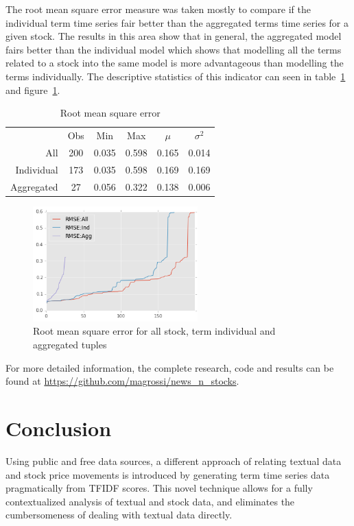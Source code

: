 \documentclass[conference,11pt]{IEEEtran}
\begin{document}
\par
The root mean square error measure was taken mostly to compare if the individual term time series fair better than the aggregated terms time series for a given stock. The results in this area show that in general, the aggregated model fairs better than the individual model which shows that modelling all the terms related to a stock into the same model is more advantageous than modelling the terms individually. The descriptive statistics of this indicator can seen in table~\ref{tab:1} and figure~\ref{fig:rmse_line}.

\begin{table}
\caption{Root mean square error}
\label{tab:1}
\begin{tabular}{ r c c c c c }
           & Obs & Min & Max & \(\mu\) & \(\sigma^2\) \\
  All & 200 & 0.035 & 0.598 & 0.165 & 0.014 \\ 
  Individual & 173 & 0.035 & 0.598 & 0.169 & 0.169 \\
  Aggregated & 27  & 0.056 & 0.322 & 0.138 & 0.006 \\
\end{tabular}
\end{table}

\begin{figure}[!htbp]
\centering
\includegraphics[width=2.5in]{rmse_line}
\caption{Root mean square error for all stock, term individual and aggregated tuples}
\label{fig:rmse_line}
\end{figure}


\par
For more detailed information, the complete research, code and results can be found at \url{https://github.com/magrossi/news_n_stocks}.

\section{Conclusion}
Using public and free data sources, a different approach of relating textual data and stock price movements is introduced by generating term time series data pragmatically from TFIDF scores. This novel technique allows for a fully contextualized analysis of  textual and stock data, and eliminates the cumbersomeness of dealing with textual data directly.
\end{document}
